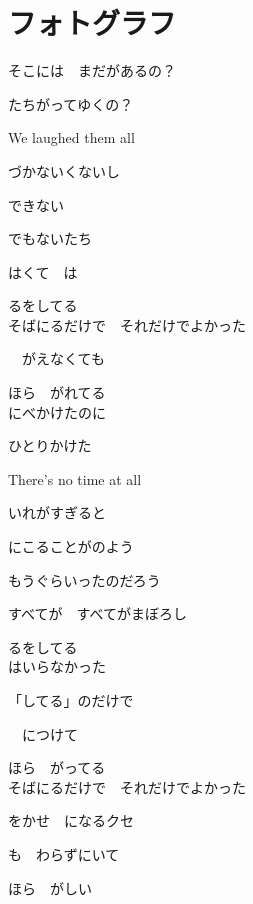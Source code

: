 \section{ フォトグラフ}
\large{

そこには　まだがあるの？

たちがってゆくの？

We laughed them all

づかないくないし

できない

でもないたち

はくて　は

るをしてる
\\

そばにるだけで　それだけでよかった

　がえなくても

ほら　がれてる
\\

にべかけたのに

ひとりかけた

There's no time at all

いれがすぎると

にこることがのよう

もうぐらいったのだろう

すべてが　すべてがまぼろし

るをしてる
\\

はいらなかった

「してる」のだけで

　につけて

ほら　がってる
\\

そばにるだけで　それだけでよかった

をかせ　になるクセ

も　わらずにいて

ほら　がしい

}

